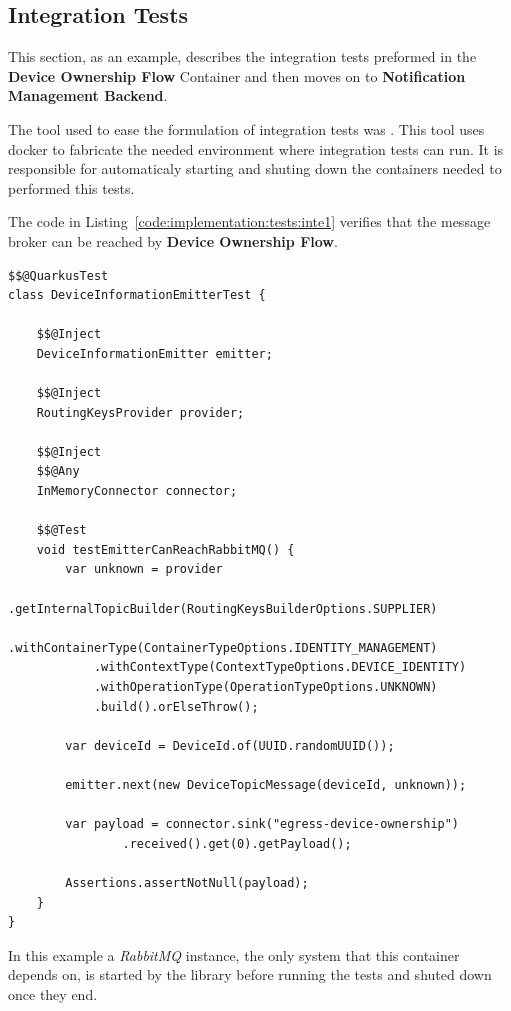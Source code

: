 \subsection{Integration Tests}
\label{subsec:implementation:tests:integration}

This section, as an example, describes the integration tests preformed in the \textbf{Device Ownership Flow} Container and then moves on to \textbf{Notification Management Backend}.

The tool used to ease the formulation of integration tests was . This tool uses docker to fabricate the needed environment where integration tests can run. It is responsible for automaticaly starting and shuting down the containers needed to performed this tests.

The code in Listing~\ref{code:implementation:tests:inte1} verifies that the message broker can be reached by \textbf{Device Ownership Flow}.

\begin{lstlisting}[style=Java, caption=Integration Test - Message Broker - \textbf{Device Ownership Flow}, label={code:implementation:tests:inte1}]
$$@QuarkusTest
class DeviceInformationEmitterTest {

    $$@Inject
    DeviceInformationEmitter emitter;

    $$@Inject
    RoutingKeysProvider provider;

    $$@Inject
    $$@Any
    InMemoryConnector connector;

    $$@Test
    void testEmitterCanReachRabbitMQ() {
        var unknown = provider
            .getInternalTopicBuilder(RoutingKeysBuilderOptions.SUPPLIER)
            .withContainerType(ContainerTypeOptions.IDENTITY_MANAGEMENT)
            .withContextType(ContextTypeOptions.DEVICE_IDENTITY)
            .withOperationType(OperationTypeOptions.UNKNOWN)
            .build().orElseThrow();

        var deviceId = DeviceId.of(UUID.randomUUID());

        emitter.next(new DeviceTopicMessage(deviceId, unknown));

        var payload = connector.sink("egress-device-ownership")
                .received().get(0).getPayload();

        Assertions.assertNotNull(payload);
    }
}
\end{lstlisting}

In this example a \textit{RabbitMQ} instance, the only system that this container depends on, is started by the  library before running the tests and shuted down once they end.

